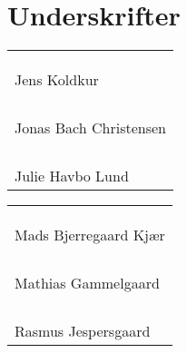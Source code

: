 \section*{Underskrifter}
\begin{center}
\begin{minipage}[b]{0.45\textwidth}
\begin{center}
\begin{tabular}{l}
\phantom{Julie er virkelig dejlig, sød og smuk} \\
\\
\\
\hline
Jens Koldkur \\
\\
\\
\\
\\
\hline
Jonas Bach Christensen \\
\\
\\
\\
\\
\hline
Julie Havbo Lund \\         
\end{tabular}
\end{center}
\end{minipage}
%
\begin{minipage}[b]{0.038\textwidth}
\phantom{xD}
\end{minipage}
\begin{minipage}[b]{0.45\textwidth}
\begin{center}
\begin{tabular}{l}
\phantom{Julieervirkeligdejligogsødogsmukogs} \\
\\
\\
\hline
Mads Bjerregaard Kjær \\
\\
\\
\\
\\
\hline
Mathias Gammelgaard \\
\\
\\
\\
\\
\hline
Rasmus Jespersgaard \\         
\end{tabular}
\end{center}
\end{minipage}
\end{center}